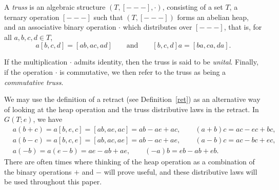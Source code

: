 \documentclass[pdftex]{sigma}
\numberwithin{equation}{section}
\begin{document}
\begin{Definition}\label{truss}
A \textit{truss} is an algebraic structure $(T,[---],\cdot)$, consisting of a set $T$, a ternary operation $[---]$ such that $(T,[---])$ forms an abelian heap, and an associative binary operation $\cdot$ which distributes over $[---]$, that is, for all $a,b,c,d \in T$,
\[
 a[b,c,d] = [ab,ac,ad] \qquad \text{and} \qquad
 [b,c,d]a=[ba,ca,da].
\]

If the multiplication $\cdot$ admits identity, then the truss is said to be \textit{unital}. Finally, if the operation $\cdot$ is commutative, we then refer to the truss as being a \textit{commutative truss}.
\end{Definition}
\begin{Remark} We may use the definition of a retract (see Definition~\ref{ret}) as an alternative way of looking at the heap operation and the truss distributive laws in the retract. In $G(T;e)$, we have
\begin{align*}
& a(b+c) = a[b,e,c] = [ab,ae,ac] = ab-ae+ac, \qquad (a+b)c = ac-ec+bc,\\
& a(b-c) = a[b,c,e] = [ab,ac,ae] = ab-ac+ae, \qquad (a-b)c = ac-bc+ec, \\
& a(-b) = a(e-b)= ae-ab+ae, \qquad (-a)b = eb-ab+eb.
 \end{align*}
There are often times where thinking of the heap operation as a combination of the binary operations $+$ and $-$ will prove useful, and these distributive laws will be used throughout this paper.
\end{Remark}
\end{document}
